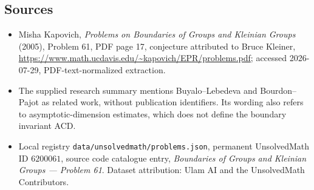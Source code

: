 \documentclass[11pt]{article}
\begin{document}
\subsection{Sources}
\begin{itemize}
\item Misha Kapovich, \emph{Problems on Boundaries of Groups and Kleinian Groups} (2005), Problem 61, PDF page 17, conjecture attributed to Bruce Kleiner, \url{https://www.math.ucdavis.edu/~kapovich/EPR/problems.pdf}; accessed 2026-07-29, PDF-text-normalized extraction.
\item The supplied research summary mentions Buyalo--Lebedeva and Bourdon--Pajot as related work, without publication identifiers. Its wording also refers to asymptotic-dimension estimates, which does not define the boundary invariant ACD.
\item Local registry \texttt{data/unsolvedmath/problems.json}, permanent UnsolvedMath ID $6200061$, source code catalogue entry, \emph{Boundaries of Groups and Kleinian Groups --- Problem 61}. Dataset attribution: Ulam AI and the UnsolvedMath Contributors.
\end{itemize}
\end{document}
